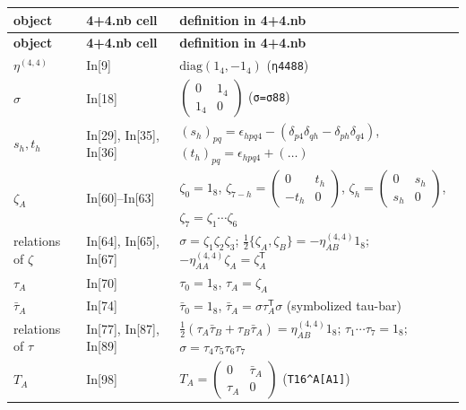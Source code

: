 \documentclass[10pt,a4paper]{article}
\begin{document}
{\footnotesize
\begin{longtable}{>{\raggedright\arraybackslash}p{}>{\raggedright\arraybackslash}p{}>{\raggedright\arraybackslash}p{}}
\toprule
\textbf{object} & \textbf{4+4.nb cell} & \textbf{definition in 4+4.nb} \\
\midrule\endfirsthead
\toprule
\textbf{object} & \textbf{4+4.nb cell} & \textbf{definition in 4+4.nb} \\
\midrule\endhead
\endfoot
\bottomrule\endlastfoot
$\eta^{(4,4)}$ & In[9] & $\mathrm{diag}(1_4,-1_4)$ (\texttt{η4488}) \\
$\sigma$ & In[18] & $\left(\begin{smallmatrix}0&1_4\\1_4&0\end{smallmatrix}\right)$ (\texttt{σ=σ88}) \\
$s_h,t_h$ & In[29], In[35], In[36] & $(s_h)_{pq}=\epsilon_{hpq4}-(\delta_{p4}\delta_{qh}-\delta_{ph}\delta_{q4})$, $(t_h)_{pq}=\epsilon_{hpq4}+(\dots)$ \\
$\zeta_A$ & In[60]–In[63] & $\zeta_0=1_8$, $\zeta_{7-h}=\left(\begin{smallmatrix}0&t_h\\-t_h&0\end{smallmatrix}\right)$, $\zeta_h=\left(\begin{smallmatrix}0&s_h\\s_h&0\end{smallmatrix}\right)$, $\zeta_7=\zeta_1\cdots\zeta_6$ \\
relations of $\zeta$ & In[64], In[65], In[67] & $\sigma=\zeta_1\zeta_2\zeta_3$; $\frac12\lbrace\zeta_A,\zeta_B\rbrace=-\eta^{(4,4)}_{AB}1_8$; $-\eta^{(4,4)}_{AA}\zeta_A=\zeta_A^{\mathsf T}$ \\
$\tau_A$ & In[70] & $\tau_0=1_8$, $\tau_A=\zeta_A$ \\
$\bar\tau_A$ & In[74] & $\bar\tau_0=1_8$, $\bar\tau_A=\sigma\tau_A^{\mathsf T}\sigma$ (symbolized tau-bar) \\
relations of $\tau$ & In[77], In[87], In[89] & $\frac12(\tau_A\bar\tau_B+\tau_B\bar\tau_A)=\eta^{(4,4)}_{AB}1_8$; $\tau_1\cdots\tau_7=1_8$; $\sigma=\tau_4\tau_5\tau_6\tau_7$ \\
$T_A$ & In[98] & $T_A=\left(\begin{smallmatrix}0&\bar\tau_A\\\tau_A&0\end{smallmatrix}\right)$ (\texttt{T16\textasciicircum{}A[A1]}) \\

\end{longtable}}
\end{document}
